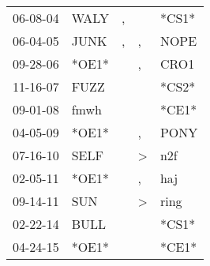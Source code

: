 \begin{supertabular}{p{0.07\textwidth}p{0.06\textwidth}p{0.02\textwidth}p{0.02\textwidth}p{0.06\textwidth}}
 06-08-04\textsuperscript{} &  WALY\textsuperscript{} &  , &               &                   *CS1* \\
 06-04-05\textsuperscript{} &  JUNK\textsuperscript{} &  , &             , &  NOPE\textsuperscript{} \\
 09-28-06\textsuperscript{} &                   *OE1* &    &             , &  CRO1\textsuperscript{} \\
 11-16-07\textsuperscript{} &  FUZZ\textsuperscript{} &    &               &                   *CS2* \\
 09-01-08\textsuperscript{} &  fmwh\textsuperscript{} &    &               &                   *CE1* \\
 04-05-09\textsuperscript{} &                   *OE1* &    &             , &  PONY\textsuperscript{} \\
 07-16-10\textsuperscript{} &  SELF\textsuperscript{} &    &  \textgreater &   n2f\textsuperscript{} \\
 02-05-11\textsuperscript{} &                   *OE1* &    &             , &   haj\textsuperscript{} \\
 09-14-11\textsuperscript{} &   SUN\textsuperscript{} &    &  \textgreater &  ring\textsuperscript{} \\
 02-22-14\textsuperscript{} &  BULL\textsuperscript{} &    &               &                   *CS1* \\
 04-24-15\textsuperscript{} &                   *OE1* &    &               &                   *CE1* \\
\end{supertabular}
